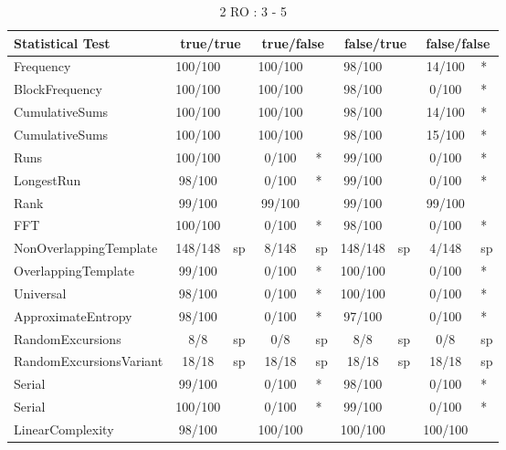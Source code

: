 \begin{table}[H]
\centering
\caption{2 RO : 3 - 5}
\label{tab:nist_22_2RO_8I}
\begin{tabular}{|l|c|l|c|l|c|l|c|l|}
\hline
\textbf{Statistical Test} & \multicolumn{2}{c|}{\textbf{true/true}} & \multicolumn{2}{c|}{\textbf{true/false}} & \multicolumn{2}{c|}{\textbf{false/true}} & \multicolumn{2}{c|}{\textbf{false/false}} \\ \hline
Frequency               & 100/100 &     & 100/100 &     &  98/100 &     &  14/100 & *   \\ \hline
BlockFrequency          & 100/100 &     & 100/100 &     &  98/100 &     &   0/100 & *   \\ \hline
CumulativeSums          & 100/100 &     & 100/100 &     &  98/100 &     &  14/100 & *   \\ \hline
CumulativeSums          & 100/100 &     & 100/100 &     &  98/100 &     &  15/100 & *   \\ \hline
Runs                    & 100/100 &     &   0/100 & *   &  99/100 &     &   0/100 & *   \\ \hline
LongestRun              &  98/100 &     &   0/100 & *   &  99/100 &     &   0/100 & *   \\ \hline
Rank                    &  99/100 &     &  99/100 &     &  99/100 &     &  99/100 &     \\ \hline
FFT                     & 100/100 &     &   0/100 & *   &  98/100 &     &   0/100 & *   \\ \hline
NonOverlappingTemplate  & 148/148 & sp  &   8/148 & sp  & 148/148 & sp  &   4/148 & sp  \\ \hline
OverlappingTemplate     &  99/100 &     &   0/100 & *   & 100/100 &     &   0/100 & *   \\ \hline
Universal               &  98/100 &     &   0/100 & *   & 100/100 &     &   0/100 & *   \\ \hline
ApproximateEntropy      &  98/100 &     &   0/100 & *   &  97/100 &     &   0/100 & *   \\ \hline
RandomExcursions        &     8/8 & sp  &     0/8 & sp  &     8/8 & sp  &     0/8 & sp  \\ \hline
RandomExcursionsVariant &   18/18 & sp  &   18/18 & sp  &   18/18 & sp  &   18/18 & sp  \\ \hline
Serial                  &  99/100 &     &   0/100 & *   &  98/100 &     &   0/100 & *   \\ \hline
Serial                  & 100/100 &     &   0/100 & *   &  99/100 &     &   0/100 & *   \\ \hline
LinearComplexity        &  98/100 &     & 100/100 &     & 100/100 &     & 100/100 &     \\ \hline
\end{tabular}
\end{table}



